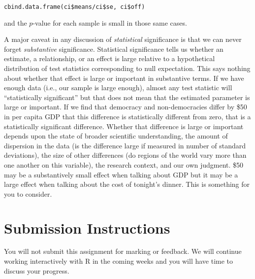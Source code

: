 \documentclass[a4paper,12pt]{article}
\begin{document}
\begin{enumerate*}
\begin{verbatim}
cbind.data.frame(ci$means/ci$se, ci$off)
\end{verbatim}

\noindent and the $p$-value for each sample is small in those same cases.

\item A major caveat in any discussion of \textit{statistical} significance is that we can never forget \textit{substantive} significance. Statistical significance tells us whether an estimate, a relationship, or an effect is large relative to a hypothetical distribution of test statistics corresponding to null expectation. This says nothing about whether that effect is large or important in substantive terms. If we have enough data (i.e., our sample is large enough), almost any test statistic will ``statistically significant'' but that does not mean that the estimated parameter is large or important. If we find that democracy and non-democracies differ by \$50 in per capita GDP that this difference is statistically different from zero, that is a statistically significant difference. Whether that difference is large or important depends upon the state of broader scientific understanding, the amount of dispersion in the data (is the difference large if measured in number of standard deviations), the size of other differences (do regions of the world vary more than one another on this variable), the research context, and our own judgment. \$50 may be a substantively small effect when talking about GDP but it may be a large effect when talking about the cost of tonight's dinner. This is something for you to consider.


\end{enumerate*}

\section{Submission Instructions}

You will not submit this assignment for marking or feedback. We will continue working interactively with R in the coming weeks and you will have time to discuss your progress.
\end{document}
